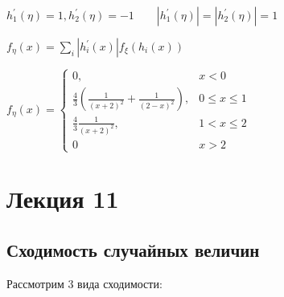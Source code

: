 \documentclass[12pt]{article}
\begin{document}
    $h_1^\prime(\eta) = 1, h_2^\prime(\eta) = -1 \qquad |h_1^\prime(\eta)| = |h_2^\prime(\eta)| = 1$

    $f_\eta(x) = \sum_i |h_i^\prime(x)| f_\xi(h_i(x))$

    $f_\eta(x) = \begin{cases}0, & x < 0 \\ \frac{4}{3}\left(\frac{1}{(x + 2)^2} + \frac{1}{(2 - x)^2}\right), & 0 \leq x \leq 1 \\ \frac{4}{3}\frac{1}{(x + 2)^2}, & 1 < x \leq 2 \\ 0 & x > 2\end{cases}$


    \section{Лекция 11}

    \subsection{Сходимость случайных величин}

    \hypertarget{convergencetypes}{}

    Рассмотрим 3 вида сходимости:
\end{document}
